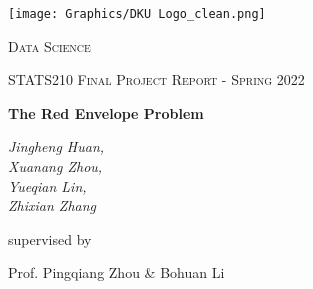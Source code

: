 \documentclass{scrartcl}
\begin{document}
\begin{titlepage}
	\centering
	\texttt{[image: Graphics/DKU Logo\_clean.png]}\par
	\vspace{2cm}
	
	{\scshape\LARGE Data Science \par}      %
	\vspace{1cm}
	{\scshape\Large STATS210 Final Project Report - Spring 2022\par}
	\vfill
	
	{\huge\bfseries The Red Envelope Problem\par}
	\vfill
	
	{\Large\itshape Jingheng Huan,\\Xuanang Zhou,\\Yueqian Lin,\\Zhixian Zhang}\par
	\vspace{2cm}

	\vfill
	supervised by\par
	Prof. Pingqiang Zhou \& Bohuan Li


	\vfill
\end{titlepage}


    



\newpage


\begin{abstract}
	    With the widespread use of mobile phone, the random amount red envelope grabbing is becoming more and more popular. Probability is a discipline that studies the statistical laws of random phenomena, and by studying the probability distribution of red envelope, this paper tries to explain the effect of the order of grabbing red envelope on the amount of money. In our experiment, we used Python to do simulation and draw plots. We construct a distribution mechanism based on experimental data and relevant analysis. We also compare our mechanism with experimental data in different aspects. Based on the results, several suggestions are made to people with different goals. Additional analysis is carried out for the luckiest people solitaire game.
\end{abstract}
\vspace{1cm}
\end{document}
